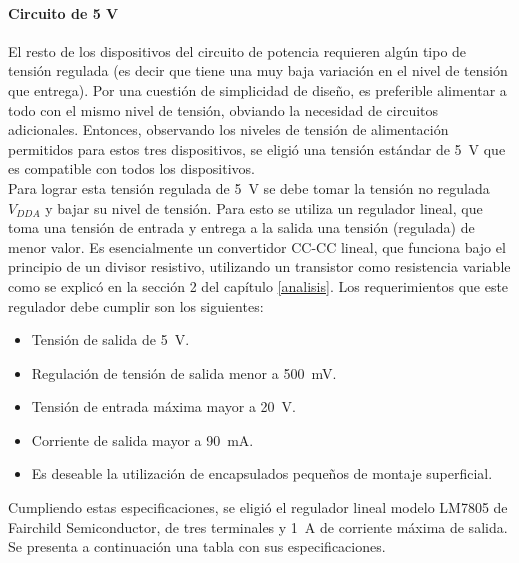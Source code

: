 \paragraph{Circuito de 5 V}

El resto de los dispositivos del circuito de potencia requieren algún tipo de tensión regulada (es decir que tiene una muy baja variación en el nivel de tensión que entrega). Por una cuestión de simplicidad de diseño, es preferible alimentar a todo con el mismo nivel de tensión, obviando la necesidad de circuitos adicionales. Entonces, observando los niveles de tensión de alimentación permitidos para estos tres dispositivos, se eligió una tensión estándar de \SI[]{5}[]{\volt} que es compatible con todos los dispositivos.\\

Para lograr esta tensión regulada de \SI[]{5}[]{\volt} se debe tomar la tensión no regulada $V_{DDA}$ y bajar su nivel de tensión. Para esto se utiliza un {\Medium regulador lineal}, que toma una tensión de entrada y entrega a la salida una tensión (regulada) de menor valor. Es esencialmente un convertidor CC-CC lineal, que funciona bajo el principio de un divisor resistivo, utilizando un transistor como resistencia variable como se explicó en la sección 2 del capítulo \ref{analisis}. Los requerimientos que este regulador debe cumplir son los siguientes:\\

\begin{itemize}
    \item Tensión de salida de \SI[]{5}[]{\volt}.
    \item Regulación de tensión de salida menor a \SI[]{500}[]{\milli\volt}.
    \item Tensión de entrada máxima mayor a \SI[]{20}[]{\volt}.
    \item Corriente de salida mayor a \SI[]{90}[]{\milli\ampere}.
    \item Es deseable la utilización de encapsulados pequeños de montaje superficial.\\
\end{itemize}

Cumpliendo estas especificaciones, se eligió el regulador lineal modelo {\Medium LM7805} de Fairchild Semiconductor, de tres terminales y \SI[]{1}[]{\ampere} de corriente máxima de salida. Se presenta a continuación una tabla con sus especificaciones.\\

